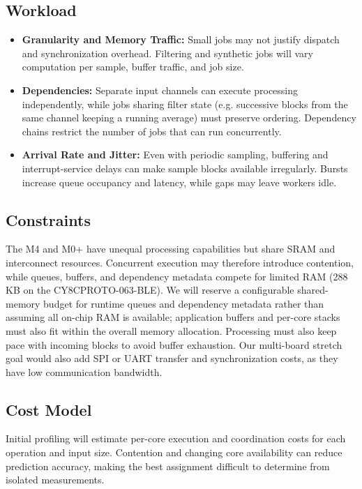 \documentclass[11pt]{article}
\begin{document}
\subsection{Workload}
\begin{itemize}
    \item \textbf{Granularity and Memory Traffic:}
    Small jobs may not justify dispatch and synchronization overhead.
    Filtering and synthetic jobs will vary computation per sample,
    buffer traffic, and job size.

    \item \textbf{Dependencies:}
    Separate input channels can execute processing independently, while jobs sharing filter state (e.g. successive blocks from the same channel keeping a running average) must preserve ordering. Dependency chains restrict the number of jobs that can run concurrently.

    \item \textbf{Arrival Rate and Jitter:}
    Even with periodic sampling, buffering and interrupt-service delays
    can make sample blocks available irregularly. Bursts increase queue
    occupancy and latency, while gaps may leave workers idle.
\end{itemize}

\subsection{Constraints}
The M4 and M0+ have unequal processing capabilities but share SRAM and
interconnect resources. Concurrent execution may therefore introduce
contention, while queues, buffers, and dependency metadata compete for
limited RAM (288 KB on the CY8CPROTO-063-BLE). We will reserve a configurable shared-memory budget for runtime queues and dependency metadata rather than assuming all on-chip RAM is available; application buffers and per-core stacks must also fit within the overall memory allocation. Processing must also keep pace with incoming blocks to avoid buffer exhaustion. Our multi-board stretch goal would also add SPI or UART
transfer and synchronization costs, as they have low communication bandwidth.

\subsection{Cost Model}
Initial profiling will estimate per-core execution and coordination costs
for each operation and input size. Contention and changing core availability
can reduce prediction accuracy, making the best assignment difficult to
determine from isolated measurements.
\end{document}
